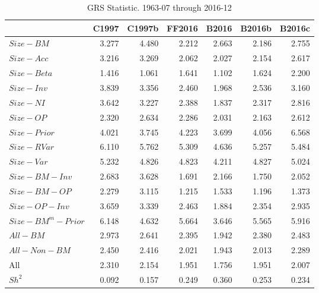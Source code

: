 
\begin{table}[!ht]
\centering
\caption{GRS Statistic. 1963-07 through 2016-12}
\begin{tabular}{lrrrrrr}
  \toprule
                       & C1997  & C1997b & FF2016 & B2016  & B2016b & B2016c \\
  \midrule
    $Size-BM$          & 3.277  & 4.480  & 2.212  & 2.663  & 2.186  & 2.755  \\
    $Size-Acc$         & 3.216  & 3.269  & 2.062  & 2.027  & 2.154  & 2.617  \\
    $Size-Beta$        & 1.416  & 1.061  & 1.641  & 1.102  & 1.624  & 2.200  \\
    $Size-Inv$         & 3.839  & 3.356  & 2.460  & 1.968  & 2.536  & 3.160  \\
    $Size-NI$          & 3.642  & 3.227  & 2.388  & 1.837  & 2.317  & 2.816  \\
    $Size-OP$          & 2.320  & 2.634  & 2.286  & 2.031  & 2.163  & 2.612  \\
    $Size-Prior$       & 4.021  & 3.745  & 4.223  & 3.699  & 4.056  & 6.568  \\
    $Size-RVar$        & 6.110  & 5.762  & 5.309  & 4.636  & 5.257  & 5.484  \\
    $Size-Var$         & 5.232  & 4.826  & 4.823  & 4.211  & 4.827  & 5.024  \\
    $Size-BM-Inv$      & 2.683  & 3.628  & 1.691  & 2.166  & 1.750  & 2.052  \\
    $Size-BM-OP$       & 2.279  & 3.115  & 1.215  & 1.533  & 1.196  & 1.373  \\
    $Size-OP-Inv$      & 3.659  & 3.339  & 2.463  & 1.884  & 2.354  & 2.935  \\
    [1em]
    $Size-BM^m-Prior$  & 6.148  & 4.632  & 5.664  & 3.646  & 5.565  & 5.916  \\
    [1em]
    $All-BM$           & 2.973  & 2.641  & 2.395  & 1.942  & 2.380  & 2.483  \\
    $All-Non-BM$       & 2.450  & 2.416  & 2.021  & 1.943  & 2.013  & 2.289  \\
    [1em]
    All                & 2.310  & 2.154  & 1.951  & 1.756  & 1.951  & 2.007  \\
    [1em]
    $Sh^2$             & 0.092  & 0.157  & 0.249  & 0.360  & 0.253  & 0.234  \\
  \bottomrule
\end{tabular}
\label{tbl:GRS}
\end{table}
